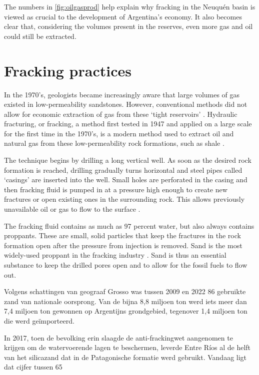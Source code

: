 The numbers in \ref{fig:oilgasprod} help explain why fracking in the Neuquén basin is viewed as crucial to the development of Argentina's economy. It also becomes clear that, considering the volumes present in the reserves, even more gas and oil could still be extracted.

\section{Fracking practices}
In the 1970's, geologists became increasingly aware that large volumes of gas existed in low-permeability sandstones. However, conventional methods did not allow for economic extraction of gas from these `tight reservoirs' \autocite{lawGasTightReservoirs1992}. Hydraulic fracturing, or fracking, a method first tested in 1947 and applied on a large scale for the first time in the 1970's, is a modern method used to extract oil and natural gas from these low-permeability rock formations, such as shale \autocite{melissadenchakFracking1012019}.

The technique begins by drilling a long vertical well. As soon as the desired rock formation is reached, drilling gradually turns horizontal and steel pipes called `casings' are inserted into the well. Small holes are perforated in the casing and then fracking fluid is pumped in at a pressure high enough to create new fractures or open existing ones in the surrounding rock. This allows previously unavailable oil or gas to flow to the surface \autocite{melissadenchakFracking1012019}.

The fracking fluid contains as much as 97 percent water, but also always contains proppants. These are small, solid particles that keep the fractures in the rock formation open after the pressure from injection is removed. Sand is the most widely-used proppant in the fracking industry \autocite{melissadenchakFracking1012019}. Sand is thus an essential substance to keep the drilled pores open and to allow for the fossil fuels to flow out.

Volgens schattingen van geograaf Grosso was tussen 2009 en 2022 86 %
gebruikte zand van nationale oorsprong. Van de bijna 8,8 miljoen ton werd iets meer dan 7,4
miljoen ton gewonnen op Argentijns grondgebied, tegenover 1,4 miljoen ton die werd
geïmporteerd.

In 2017, toen de bevolking erin slaagde de anti-frackingwet aangenomen te krijgen om de
watervoerende lagen te beschermen, leverde Entre Ríos al de helft van het silicazand dat in de
Patagonische formatie werd gebruikt. Vandaag ligt dat cijfer tussen 65 %

